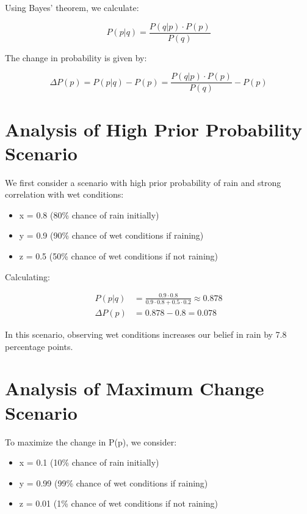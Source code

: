\documentclass[10pt,a4paper]{article}
\begin{document}
Using Bayes' theorem, we calculate:

\begin{equation}
    P(p|q) = \frac{P(q|p) \cdot P(p)}{P(q)}
\end{equation}

The change in probability is given by:

\begin{equation}
    \Delta P(p) = P(p|q) - P(p) = \frac{P(q|p) \cdot P(p)}{P(q)} - P(p)
\end{equation}

\section{Analysis of High Prior Probability Scenario}
We first consider a scenario with high prior probability of rain and strong correlation with wet conditions:

\begin{itemize}
    \item x = 0.8 (80\% chance of rain initially)
    \item y = 0.9 (90\% chance of wet conditions if raining)
    \item z = 0.5 (50\% chance of wet conditions if not raining)
\end{itemize}

Calculating:

\begin{align*}
    P(p|q) &= \frac{0.9 \cdot 0.8}{0.9 \cdot 0.8 + 0.5 \cdot 0.2} \approx 0.878 \\
    \Delta P(p) &= 0.878 - 0.8 = 0.078
\end{align*}

In this scenario, observing wet conditions increases our belief in rain by 7.8 percentage points.

\section{Analysis of Maximum Change Scenario}
To maximize the change in P(p), we consider:

\begin{itemize}
    \item x = 0.1 (10\% chance of rain initially)
    \item y = 0.99 (99\% chance of wet conditions if raining)
    \item z = 0.01 (1\% chance of wet conditions if not raining)
\end{itemize}
\end{document}
